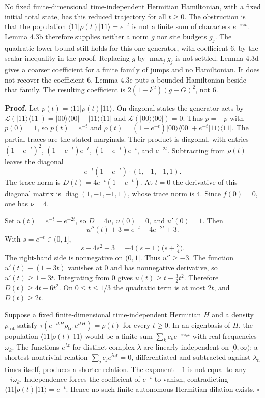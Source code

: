 \documentclass[
  11pt,
]{article}
\begin{document}
No fixed finite-dimensional time-independent Hermitian Hamiltonian,
with a fixed initial total state, has this reduced trajectory for all \(t\ge 0\). The obstruction is that the
population \(\langle11|\rho(t)|11\rangle=e^{-t}\) is not a finite sum of
characters \(e^{-i\omega t}\). Lemma 4.3b therefore supplies neither a
norm \(g\) nor site budgets \(g_j\). The quadratic lower bound still
holds for this one generator, with coefficient \(6\), by the scalar
inequality in the proof. Replacing \(g\) by \(\max_j g_j\) is not
settled. Lemma 4.3d gives a coarser coefficient for a finite family of
jumps and no Hamiltonian. It does not recover the coefficient \(6\).
Lemma 4.3e puts a bounded Hamiltonian beside that family. The resulting
coefficient is \(2(1+k^2)(g+G)^2\), not \(6\).

\textbf{Proof.} Let \(p(t)=\langle11|\rho(t)|11\rangle\). On diagonal states
the generator acts by
\(\mathcal L(|11\rangle\langle11|)=|00\rangle\langle00|-|11\rangle\langle11|\)
and \(\mathcal L(|00\rangle\langle00|)=0\). Thus \(\dot p=-p\) with
\(p(0)=1\), so \(p(t)=e^{-t}\) and
\(\rho(t)=(1-e^{-t})|00\rangle\langle00|+e^{-t}|11\rangle\langle11|\).
The partial traces are the stated marginals. Their product is diagonal,
with entries
\((1-e^{-t})^2\), \((1-e^{-t})e^{-t}\), \((1-e^{-t})e^{-t}\), and
\(e^{-2t}\). Subtracting from \(\rho(t)\) leaves the diagonal
\[
e^{-t}(1-e^{-t})\cdot(1,-1,-1,1).
\]
The trace norm is \(D(t)=4e^{-t}(1-e^{-t})\). At \(t=0\) the derivative
of this diagonal matrix is \(\operatorname{diag}(1,-1,-1,1)\), whose
trace norm is \(4\). Since \(f(0)=0\), one has \(\nu=4\).

Set \(u(t)=e^{-t}-e^{-2t}\), so \(D=4u\), \(u(0)=0\), and \(u'(0)=1\).
Then
\[
u''(t)+3=e^{-t}-4e^{-2t}+3.
\]
With \(s=e^{-t}\in(0,1]\),
\[
s-4s^2+3=-4(s-1)\bigl(s+\tfrac34\bigr).
\]
The right-hand side is nonnegative on \((0,1]\). Thus \(u''\ge-3\).
The function \(u'(t)-(1-3t)\) vanishes at \(0\) and has nonnegative
derivative, so \(u'(t)\ge 1-3t\). Integrating from \(0\) gives
\(u(t)\ge t-\tfrac32 t^2\). Therefore \(D(t)\ge 4t-6t^2\). On
\(0\le t\le 1/3\) the quadratic term is at most \(2t\), and
\(D(t)\ge 2t\).

Suppose a fixed finite-dimensional time-independent Hermitian \(H\) and a density
\(\rho_{\mathrm{tot}}\) satisfy
\(\tau(e^{-itH}\rho_{\mathrm{tot}}e^{itH})=\rho(t)\) for every \(t\ge 0\).
In an eigenbasis of \(H\), the population
\(\langle11|\rho(t)|11\rangle\) would be a finite sum
\(\sum_k c_k e^{-i\omega_k t}\) with real frequencies \(\omega_k\).
The functions \(e^{\lambda t}\) for distinct complex \(\lambda\) are
linearly independent on \([0,\infty)\): a shortest nontrivial relation
\(\sum_j c_j e^{\lambda_j t}=0\), differentiated and subtracted against
\(\lambda_n\) times itself, produces a shorter relation. The exponent
\(-1\) is not equal to any \(-i\omega_k\). Independence forces the
coefficient of \(e^{-t}\) to vanish, contradicting
\(\langle11|\rho(t)|11\rangle=e^{-t}\). Hence no such finite autonomous Hermitian
dilation exists. \(\square\)
\end{document}
